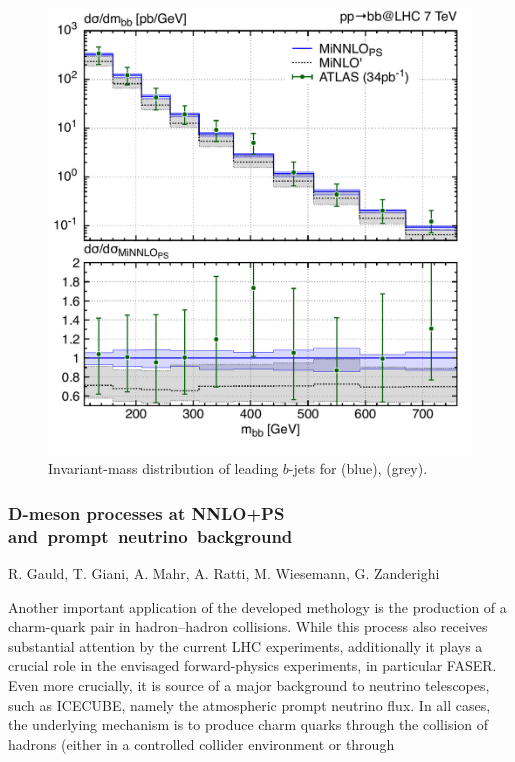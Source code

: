 \documentclass{FBR_Bericht_2025}
\begin{document}
\begin{refsection}
\begin{figure}[t]
\begin{center}
\includegraphics[width=0.95\linewidth]{plots/bjet_mbb.pdf}
\caption{Invariant-mass distribution of leading $b$-jets for \minnlo{} (blue), \minlo{} (grey).}
\label{fig:bb}
\end{center}
\end{figure}
%
\subsubsection{D-meson processes at NNLO+PS \mbox{and prompt neutrino background}}
\begin{Namen}
R. Gauld, T. Giani, A. Mahr, A. Ratti, M. Wiesemann, G. Zanderighi
\end{Namen}

Another important application of the developed \minnlo{} methology is the production
of a charm-quark pair in hadron--hadron collisions. While this process also receives
substantial attention by the current LHC experiments, additionally it plays a crucial role in 
the envisaged forward-physics experiments, in particular FASER. Even more crucially,
it is source of a major background to neutrino telescopes, such as ICECUBE, namely
the atmospheric prompt neutrino flux.
In all cases, the underlying mechanism is to produce charm quarks through the collision
of hadrons (either in a controlled collider environment or through 



\end{refsection}
\end{document}
